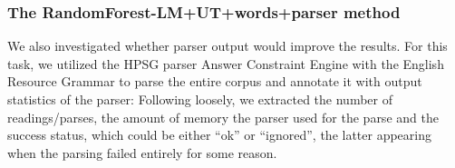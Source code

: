 \documentclass[a4paper,10pt]{scrartcl}
\theoremstyle{style}
\begin{document}














\subsubsection{The RandomForest-LM+UT+words+parser method}
We also investigated whether parser output would improve the results. For this task, we utilized the HPSG parser Answer Constraint Engine \citep{ace} with the English Resource Grammar \citep{copestake2002implementing} to parse the entire corpus and annotate it with output statistics of the parser: Following \cite{wagner2007comparative} loosely, we extracted the number of readings/parses, the amount of memory the parser used for the parse and the success status, which could be either ``ok'' or ``ignored'', the latter appearing when the parsing failed entirely for some reason.
\end{document}

